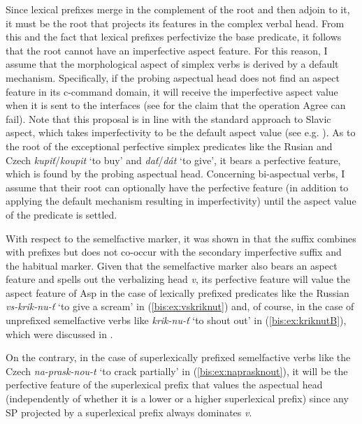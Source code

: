 \documentclass[output=paper]{langscibook}
\begin{document}
Since lexical prefixes merge in the complement of the root and then adjoin to it, it must be the root that projects its features in the complex verbal head. From this and the fact that lexical prefixes perfectivize the base predicate, it follows that the root cannot have an imperfective aspect feature. For this reason, I assume that the morphological aspect of simplex verbs is derived by a default mechanism. Specifically, if the probing aspectual head does not find an aspect feature in its c-command domain, it will receive the imperfective aspect value when it is sent to the interfaces (see \citealt{Preminger2014} for the claim that the operation Agree can fail). Note that this proposal is in line with the standard approach to Slavic aspect, which takes imperfectivity to be the default aspect value (see e.g. \citealt{Jakobson1932,Jakobson1956,Comrie1976,Nubler.etal2017}). As to the root of the exceptional perfective simplex predicates like the Rusian and Czech \textit{kupiť}/\textit{koupit} ‘to buy’ and \textit{dať}/\textit{dát} ‘to give’, it bears a perfective feature, which is found by the probing aspectual head. Concerning bi-aspectual verbs, I assume that their root can optionally have the perfective feature (in addition to applying the default mechanism resulting in imperfectivity) until the aspect value of the predicate is settled.

With respect to the semelfactive marker, it was shown in  that the suffix combines with prefixes but does not co-occur with the secondary imperfective suffix and the habitual marker. Given that the semelfactive marker also bears an aspect feature and spells out the verbalizing head \textit{v}, its perfective feature will value the aspect feature of Asp in the case of lexically prefixed predicates like the Russian \textit{vs-krik-nu-ť} ‘to give a scream’ in (\ref{bis:ex:vskriknut}) and, of course, in the case of unprefixed semelfactive verbs like \textit{krik-nu-ť} ‘to shout out’ in (\ref{bis:ex:kriknutB}), which were discussed in .

On the contrary, in the case of superlexically prefixed semelfactive verbs like the Czech \textit{na-prask-nou-t} ‘to crack partially’ in (\ref{bis:ex:naprasknout}), it will be the perfective feature of the superlexical prefix that values the aspectual head (independently of whether it is a lower or a higher superlexical prefix) since any SP projected by a superlexical prefix always dominates \textit{v}.
\end{document}
